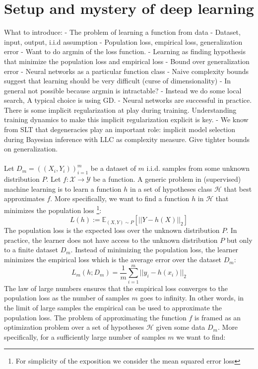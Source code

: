 \documentclass[11pt]{article}
\begin{document}
\section{Setup and mystery of deep learning}
What to introduce:
- The problem of learning a function from data
- Dataset, input, output, i.i.d assumption
- Population loss, empirical loss, generalization error
- Want to do argmin of the loss function. 
- Learning as finding hypothesis that minimize the population loss and empirical loss
- Bound over generalization error
- Neural networks as a particular function class
- Naive complexity bounds suggest that learning should be very difficult (curse of dimensionality)
- In general not possible because argmin is intractable?
- Instead we do some local search, A typical choice is using GD.
- Neural networks are successful in practice. There is some implicit regularization at play during training. Understanding training dynamics to make this implicit regularization explicit is key. 
- We know from SLT that degeneracies play an important role: implicit model selection during Bayesian inference with LLC as complexity measure. Give tighter bounds on generalization.
\\
\\
Let $D_m = {((X_i, Y_i))_{i=1}^m}$ be a dataset of $m$ i.i.d. samples from some unknown distribution $P$. Let $f: \mathcal{X} \to \mathcal{Y}$ be a function. A generic problem in (supervised) machine learning is to learn a function $h$ in a set of hypotheses class $\mathcal{H}$ that best approximates $f$. More specifically, we want to find a function $h$ in $\mathcal{H}$ that minimizes the population loss \footnote{For simplicity of the exposition we consider the mean squared error loss}:
\begin{equation}
L(h) := \mathbb{E}_{(X,Y) \sim P} [||Y - h(X)||_2]
\end{equation}
The population loss is the expected loss over the unknown distribution $P$. In practice, the learner does not have access to the unknown distribution $P$ but only to a finite dataset $D_m$. Instead of minimizing the population loss, the learner minimizes the empirical loss which is the average error over the dataset $D_m$:
\begin{equation}
L_m(h; D_m) = \frac{1}{m} \sum_{i=1}^m ||y_i - h(x_i)||_2
\end{equation}
The law of large numbers ensures that the empirical loss converges to the population loss as the number of samples $m$ goes to infinity. In other words, in the limit of large samples the empirical can be used to approximate the population loss. The problem of approximating the function $f$ is framed as an optimization problem over a set of hypotheses $\mathcal{H}$ given some data $D_m$. More specifically, for a sufficiently large number of samples $m$ we want to find:
\end{document}
